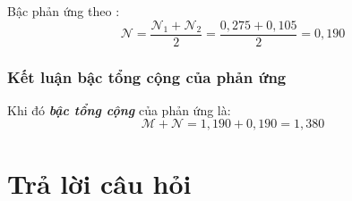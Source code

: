 Bậc phản ứng theo :
\begin{equation}
    \mathcal{N} = \frac{\mathcal{N}_1 + \mathcal{N}_2}{2} = \frac{0,275 + 0,105}{2} = 0,190
\end{equation}

\subsubsection{Kết luận bậc tổng cộng của phản ứng}
Khi đó \textbf{\textit{bậc tổng cộng}} của phản ứng là:
\begin{equation}
    \boxed{\mathcal{M} + \mathcal{N} = 1{,}190 + 0{,}190 = 1{,}380}
\end{equation}

\section{Trả lời câu hỏi}

